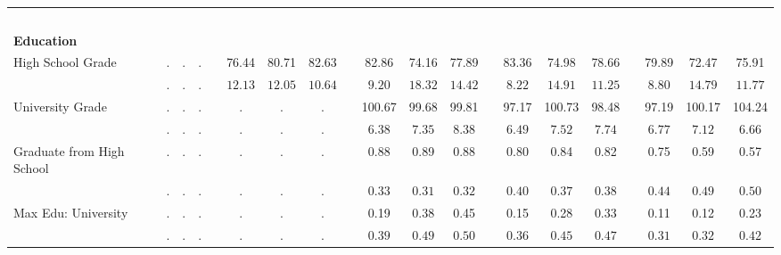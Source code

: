 \begin{center}
{\begin{longtable}{L{5cm} c c c p{.5cm} c c c p{.5cm} c c c p{.5cm} c c c p{.5cm} c c c}
 ~\\[-.5em]
\textbf{Education} \\[.6em]
 \quad High School Grade & . &         . &         . & &     76.44 &     80.71 &     82.63 & &     82.86 &     74.16 &     77.89 & &     83.36 &     74.98 &     78.66 & &     79.89 &     72.47 &     75.91 \\*
 \quad & $\mathit{        .}$ & $\mathit{        .}$ & $\mathit{        .}$ & & $\mathit{    12.13}$ & $\mathit{    12.05}$ & $\mathit{    10.64}$ & & $\mathit{     9.20}$ & $\mathit{    18.32}$ & $\mathit{    14.42}$ & & $\mathit{     8.22}$ & $\mathit{    14.91}$ & $\mathit{    11.25}$ & & $\mathit{     8.80}$ & $\mathit{    14.79}$ & $\mathit{    11.77}$ \\[.2em]
 \quad University Grade & . &         . &         . & &         . &         . &         . & &    100.67 &     99.68 &     99.81 & &     97.17 &    100.73 &     98.48 & &     97.19 &    100.17 &    104.24 \\*
 \quad & $\mathit{        .}$ & $\mathit{        .}$ & $\mathit{        .}$ & & $\mathit{        .}$ & $\mathit{        .}$ & $\mathit{        .}$ & & $\mathit{     6.38}$ & $\mathit{     7.35}$ & $\mathit{     8.38}$ & & $\mathit{     6.49}$ & $\mathit{     7.52}$ & $\mathit{     7.74}$ & & $\mathit{     6.77}$ & $\mathit{     7.12}$ & $\mathit{     6.66}$ \\[.2em]
 \quad Graduate from High School & . &         . &         . & &         . &         . &         . & &      0.88 &      0.89 &      0.88 & &      0.80 &      0.84 &      0.82 & &      0.75 &      0.59 &      0.57 \\*
 \quad & $\mathit{        .}$ & $\mathit{        .}$ & $\mathit{        .}$ & & $\mathit{        .}$ & $\mathit{        .}$ & $\mathit{        .}$ & & $\mathit{     0.33}$ & $\mathit{     0.31}$ & $\mathit{     0.32}$ & & $\mathit{     0.40}$ & $\mathit{     0.37}$ & $\mathit{     0.38}$ & & $\mathit{     0.44}$ & $\mathit{     0.49}$ & $\mathit{     0.50}$ \\[.2em]
 \quad Max Edu: University & . &         . &         . & &         . &         . &         . & &      0.19 &      0.38 &      0.45 & &      0.15 &      0.28 &      0.33 & &      0.11 &      0.12 &      0.23 \\*
 \quad & $\mathit{        .}$ & $\mathit{        .}$ & $\mathit{        .}$ & & $\mathit{        .}$ & $\mathit{        .}$ & $\mathit{        .}$ & & $\mathit{     0.39}$ & $\mathit{     0.49}$ & $\mathit{     0.50}$ & & $\mathit{     0.36}$ & $\mathit{     0.45}$ & $\mathit{     0.47}$ & & $\mathit{     0.31}$ & $\mathit{     0.32}$ & $\mathit{     0.42}$ \\[.2em]

\end{longtable}}
\end{center}
